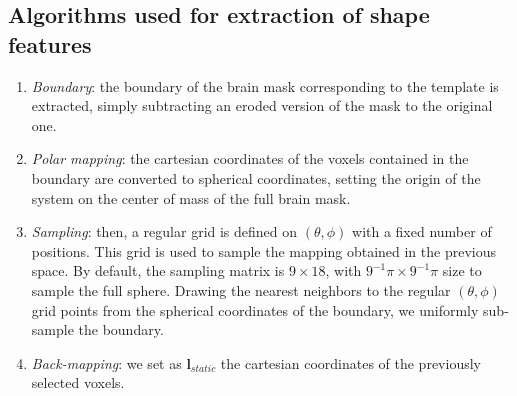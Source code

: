 \documentclass{frontiers}
\newcommand{\lm}[1]{\ensuremath{\mathbf{l}_{#1}}}
\newcommand{\emitem}[1]{\item \emph{#1}}
\begin{document}
\subsection*{Algorithms used for extraction of shape features}
\par

\begin{myalgorithm}
\begin{enumerate}
\emitem{Boundary}: the boundary of the brain mask corresponding to the template is
  extracted, simply subtracting an eroded version of the mask to the original one.
\emitem{Polar mapping}: the cartesian coordinates of the voxels contained in the boundary
  are converted to spherical coordinates, setting the origin of the system on the center
  of mass of the full brain mask.
\emitem{Sampling}: then, a regular grid is defined on $(\theta,\phi)$ with a fixed number
  of positions. This grid is used to sample the mapping obtained in the previous space.
  By default, the sampling matrix is $9\times18$, with $9^{-1}\pi \times 9^{-1}\pi$ size
  to sample the full sphere.
  Drawing the nearest neighbors to the regular $(\theta,\phi)$ grid points from the spherical
  coordinates of the boundary, we uniformly sub-sample the boundary.
\emitem{Back-mapping}: we set as \lm{static} the cartesian coordinates of the
  previously selected voxels.
\end{enumerate}
\end{myalgorithm}
\end{document}

